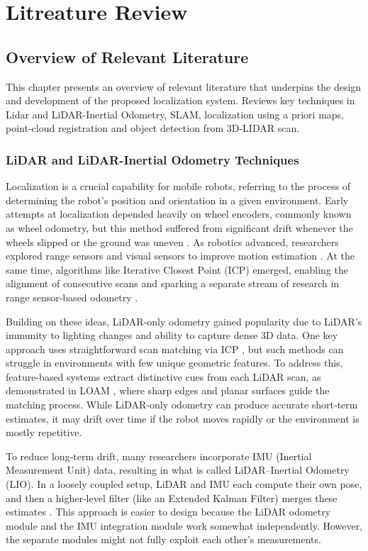 \chapter{Litreature Review}
\label{ch:intro}
\section{Overview of Relevant Literature}
This chapter presents an overview of relevant literature that underpins the design and development of the proposed localization system. Reviews key techniques in Lidar and LiDAR-Inertial Odometry, SLAM, localization using a priori maps, point-cloud registration and object detection from 3D-LIDAR scan.
\subsection{LiDAR and LiDAR-Inertial Odometry Techniques}
Localization is a crucial capability for mobile robots, referring to the process of determining the robot’s position and orientation in a given environment. Early attempts at localization depended heavily on wheel encoders, commonly known as wheel odometry, but this method suffered from significant drift whenever the wheels slipped or the ground was uneven \cite{MohamedOdometry}. As robotics advanced, researchers explored range sensors and visual sensors to improve motion estimation \cite{WangVisionSurvey}. At the same time, algorithms like Iterative Closest Point (ICP) emerged, enabling the alignment of consecutive scans and sparking a separate stream of research in range sensor‐based odometry \cite{BeslICP1992}.

Building on these ideas, LiDAR‐only odometry gained popularity due to LiDAR’s immunity to lighting changes and ability to capture dense 3D data. One key approach uses straightforward scan matching via ICP \cite{BeslICP1992}, but such methods can struggle in environments with few unique geometric features. To address this, feature-based systems extract distinctive cues from each LiDAR scan, as demonstrated in LOAM \cite{ZhangSinghLOAM2014}, where sharp edges and planar surfaces guide the matching process. While LiDAR‐only odometry can produce accurate short‐term estimates, it may drift over time if the robot moves rapidly or the environment is mostly repetitive.

To reduce long‐term drift, many researchers incorporate IMU (Inertial Measurement Unit) data, resulting in what is called LiDAR–Inertial Odometry (LIO). In a loosely coupled setup, LiDAR and IMU each compute their own pose, and then a higher‐level filter (like an Extended Kalman Filter) merges these estimates \cite{TangLooselyCoupled}. This approach is easier to design because the LiDAR odometry module and the IMU integration module work somewhat independently. However, the separate modules might not fully exploit each other’s measurements.


